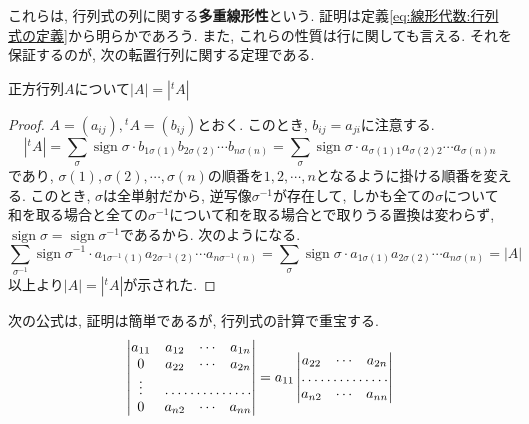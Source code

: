 \documentclass[a4j,dvipdfmx]{jsarticle}
\numberwithin{equation}{section}
\newcommand{\sign}{\mathop{\mathrm{sign}}\nolimits}
\begin{document}
            これらは, 行列式の列に関する\textbf{多重線形性}という. 証明は定義\eqref{eq:線形代数:行列式の定義}から明らかであろう.
            また, これらの性質は行に関しても言える. それを保証するのが, 次の転置行列に関する定理である.
            \begin{screen}
                正方行列$A$について$|A|=|{}^t\!A|$
            \end{screen}
            \begin{proof}
                $A=(a_{ij}),{}^t\!A=(b_{ij})$とおく. このとき, $b_{ij}=a_{ji}$に注意する.
                \begin{equation*}
                    |{}^t\!A|=\sum_{\sigma} \sign\sigma\cdot b_{1\sigma(1)}b_{2\sigma(2)}\cdots b_{n\sigma(n)}=\sum_{\sigma} \sign\sigma\cdot a_{\sigma(1)1}a_{\sigma(2)2}\cdots a_{\sigma(n)n}
                \end{equation*}
                であり, $\sigma(1),\sigma(2),\cdots,\sigma(n)$の順番を$1,2,\cdots,n$となるように掛ける順番を変える.  
                このとき, $\sigma$は全単射だから, 逆写像$\sigma^{-1}$が存在して, しかも全ての$\sigma$について和を取る場合と全ての$\sigma^{-1}$について和を取る場合とで取りうる置換は変わらず, $\sign\sigma=\sign\sigma^{-1}$であるから.
                次のようになる.
                \begin{equation*}
                    \sum_{\sigma^{-1}} \sign\sigma^{-1}\cdot a_{1\sigma^{-1}(1)}a_{2\sigma^{-1}(2)}\cdots a_{n\sigma^{-1}(n)}=\sum_{\sigma} \sign\sigma\cdot a_{1\sigma(1)}a_{2\sigma(2)}\cdots a_{n\sigma(n)}=|A|
                \end{equation*}
                以上より$|A|=|{}^t\!A|$が示された.
            \end{proof}
            \clearpage
            次の公式は, 証明は簡単であるが, 行列式の計算で重宝する.
            \begin{equation}
                \begin{vmatrix}
                    a_{11} & a_{12} & \cdots & a_{1n}\\
                    0 & a_{22} & \cdots & a_{2n}\\
                    \vdots & \hdotsfor{3}\\
                    0 & a_{n2} & \cdots & a_{nn}
                \end{vmatrix}
                =a_{11}\begin{vmatrix}
                    a_{22} & \cdots & a_{2n}\\
                    \hdotsfor{3}\\
                    a_{n2} & \cdots & a_{nn}
                \end{vmatrix} \label{eq:線形代数:行列式の簡単化}
            \end{equation}
\end{document}
